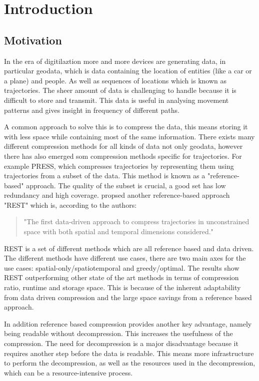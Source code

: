 \chapter{Introduction}
\section{Motivation}

In the era of digitilaztion more and more devices are generating data, in particular geodata, which is data containing the location of entities (like a car or a plane) and people. As well as sequences of locations which is known as trajectories. The sheer amount of data is challenging to handle because it is difficult to store and transmit. This data is useful in analysing movement patterns and gives insight in frequency of different paths.

A common approach to solve this is to compress the data, this means storing it with less space while containing most of the same information. There exists many different compression methods for all kinds of data not only geodata, however there has also emerged som compression methods specific for trajectories. For example PRESS, which compresses trajectories by representing them using trajectories from a subset of the data. This method is known as a "reference-based" approach. The quality of the subset is crucial, a good set has low redundancy and high coverage. \textcite{zhao2018rest} propsed another reference-based approach "REST" which is, according to the authors:
\begin{quote}
    "The first data-driven approach to compress trajectories in unconstrained space with both spatial and temporal dimensions considered."
\end{quote}
REST is a set of different methods which are all reference based and data driven. The different methods have different use cases, there are two main axes for the use cases: spatial-only/spatiotemporal and greedy/optimal. The results show REST outperforming other state of the art methods in terms of compression ratio, runtime and storage space. This is because of the inherent adaptability from data driven compression and the large space savings from a reference based approach.

In addition reference based compression provides another key advantage, namely being readable without decompression. This increases the usefulness of the compression. The need for decompression is a major disadvantage because it requires another step before the data is readable. This means more infrastructure to perform the decompression, as well as the resources used in the decompression, which can be a resource-intensive process.


